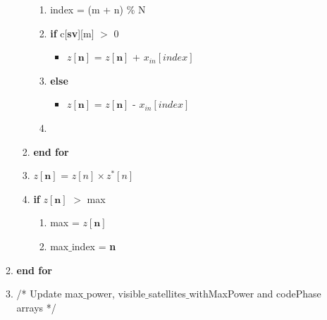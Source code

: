 \documentclass[journal,10pt,onecolumn]{article}
\begin{document}
\begin{enumerate}
\begin{enumerate}
\begin{enumerate}
            \begin{enumerate}
                \item[] index = (m + n) $\%$ N
                \item[] \textbf{if} c[\textbf{sv}][m] $>$ 0
            \begin{itemize}
            \item[] $z[\textbf{n}]$ = $z[\textbf{n}]$ + $x_{in}[index]$ 
            \end{itemize}
            \item[] \textbf{else}
            \begin{itemize}
                \item[] $z[\textbf{n}]$ = $z[\textbf{n}]$ - $x_{in}[index]$ 
            \end{itemize}
            \item[] \end{enumerate}
            \item[] \textbf{end for}
            \item[] $z[\textbf{n}]$ = $z[n]\times z^*[n]$
            \item[] \textbf{if} $z[\textbf{n}]$ $>$ max
            \begin{enumerate}
                \item[] max = $z[\textbf{n}]$
                \item[] max$\_$index = \textbf{n}
            \end{enumerate}
        \end{enumerate}
        \item[] \textbf{end for}
        
        \item[] /* Update max$\_$power, visible$\_$satellites$\_$withMaxPower and codePhase arrays */


\end{enumerate}
\end{enumerate}
\end{document}
